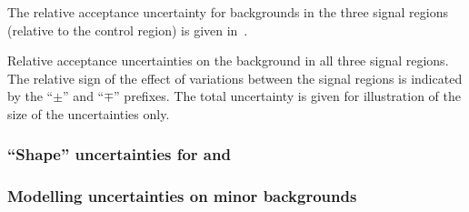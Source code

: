 The relative acceptance uncertainty for \ttbar backgrounds in the
three signal regions (relative to the \ZHF control region) is given
in~.

\begin{table}[htbp]
  \centering

  

  \caption{Relative acceptance uncertainties on the \ttbar background
    in all three signal regions. The relative sign of the effect of
    variations between the signal regions is indicated by the
    ``$\pm$'' and ``$\mp$'' prefixes. The total uncertainty is given
    for illustration of the size of the uncertainties only.}
  \label{tab:uncertainties_ttbar_extrapol}
\end{table}

\subsubsection{``Shape'' uncertainties for \ZHF and \ttbar}


\subsubsection{Modelling uncertainties on minor backgrounds}

